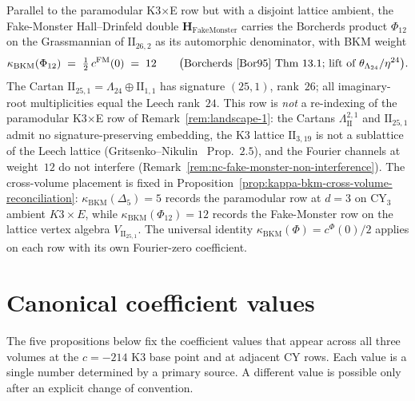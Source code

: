 \begin{remark}
\label{rem:landscape-fake-monster-row}
Parallel to the paramodular K3$\times$E row but with a disjoint lattice
ambient, the Fake-Monster Hall--Drinfeld double
$\mathbf H_{\mathrm{FakeMonster}}$ carries the Borcherds product
$\Phi_{12}$ on the Grassmannian of $\mathrm{II}_{26,2}$ as its
automorphic denominator, with BKM weight
\[
 \kappa_{\mathrm{BKM}}(\Phi_{12}) \;=\; \tfrac{1}{2}\,c^{\mathrm{FM}}(0) \;=\; 12
 \qquad\bigl(\text{Borcherds~\cite{Bor95} Thm~$13.1$;
 lift of $\theta_{\Lambda_{24}}/\eta^{24}$}\bigr).
\]
The Cartan $\mathrm{II}_{25,1} = \Lambda_{24}\oplus\mathrm{II}_{1,1}$
has signature $(25,1)$, rank~$26$; all imaginary-root multiplicities
equal the Leech rank~$24$. This row is \emph{not} a re-indexing of the
paramodular K3$\times$E row of
Remark~\ref{rem:landscape-1}: the Cartans
$\Lambda^{2,1}_{\mathrm{II}}$ and $\mathrm{II}_{25,1}$ admit no
signature-preserving embedding, the K3 lattice $\mathrm{II}_{3,19}$ is
not a sublattice of the Leech lattice
(Gritsenko--Nikulin~\cite{GritsenkoNikulin1998} Prop.~$2.5$), and the
Fourier channels at weight~$12$ do not interfere
(Remark~\ref{rem:nc-fake-monster-non-interference}). The cross-volume
placement is fixed in
Proposition~\ref{prop:kappa-bkm-cross-volume-reconciliation}:
$\kappa_{\mathrm{BKM}}(\Delta_5) = 5$ records the paramodular row at
$d = 3$ on CY$_3$ ambient $K3\times E$, while
$\kappa_{\mathrm{BKM}}(\Phi_{12}) = 12$ records the Fake-Monster row on
the lattice vertex algebra $V_{\mathrm{II}_{25,1}}$. The universal
identity $\kappa_{\mathrm{BKM}}(\Phi) = c^\Phi(0)/2$ applies on each
row with its own Fourier-zero coefficient.
\end{remark}

\section*{Canonical coefficient values}
\label{sec:canonical-coefficient-values}

The five propositions below fix the coefficient values that appear
across all three volumes at the $c=-214$ K3 base point and at
adjacent CY rows. Each value is a single number determined by a
primary source. A different value is possible only after an explicit
change of convention.

